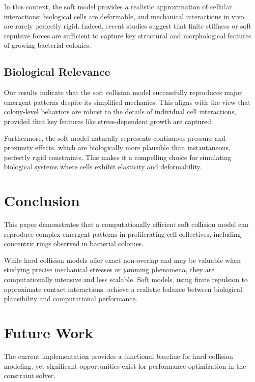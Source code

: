 \documentclass[conference]{IEEEtran}
\begin{document}
In this context, the soft model provides a realistic approximation of cellular interactions: biological cells are deformable, and mechanical interactions in vivo are rarely perfectly rigid. Indeed, recent studies \cite{Khan_2024, Ghosh2015, SantosDiaz2025} suggest that finite stiffness or soft repulsive forces are sufficient to capture key structural and morphological features of growing bacterial colonies.

\subsection{Biological Relevance}

Our results indicate that the soft collision model successfully reproduces major emergent patterns despite its simplified mechanics. This aligns with the view that colony-level behaviors are robust to the details of individual cell interactions, provided that key features like stress-dependent growth are captured.

Furthermore, the soft model naturally represents continuous pressure and proximity effects, which are biologically more plausible than instantaneous, perfectly rigid constraints. This makes it a compelling choice for simulating biological systems where cells exhibit elasticity and deformability.

\section{Conclusion}

This paper demonstrates that a computationally efficient soft collision model can reproduce complex emergent patterns in proliferating cell collectives, including concentric rings observed in bacterial colonies.

While hard collision models offer exact non-overlap and may be valuable when studying precise mechanical stresses or jamming phenomena, they are computationally intensive and less scalable. Soft models, using finite repulsion to approximate contact interactions, achieve a realistic balance between biological plausibility and computational performance.

\newpage
\section{Future Work}

The current implementation provides a functional baseline for hard collision modeling, yet significant opportunities exist for performance optimization in the constraint solver.
\end{document}
